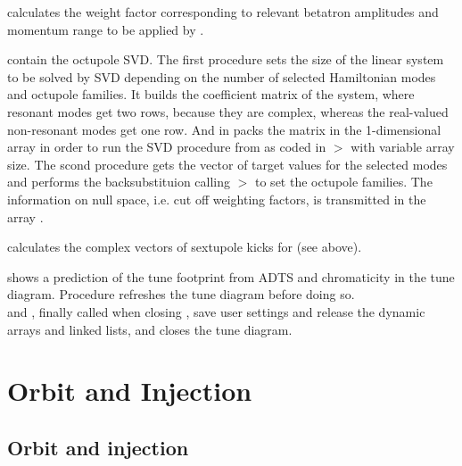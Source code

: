 \documentclass[12pt]{article}
\newcommand\code[1]{{\tt #1}}
\newcommand{\unico}[1]{{\color{burntorange}\code{#1}}}
\newcommand{\prcod}[2]{\opauni{#1}$>$\unico{#2}}
\newcommand{\opagui}[1]{\colorbox{blue!20}{{\color{black}\code{#1}}}}
\newcommand{\oguih}[2]{\subsection{\label{#2}#1}{\Huge\opagui{#2}}\\}
\newcommand{\ogui}[1]{\hyperref[#1]{\opagui{#1}}}
\newcommand{\opauni}[1]{\colorbox{orange!30}{{\color{black}\code{#1}}}}
\newcommand{\ouni}[1]{\hyperref[#1]{\opauni{#1}}}
\begin{document}
{\unico{HamScaling} calculates the weight factor corresponding to relevant betatron amplitudes and momentum range to be applied by \unico{Penalty}.

\unico{Oct\_sv(dcmp,bskb)} contain the octupole SVD. The first procedure sets the size of the linear system to be solved by SVD depending on the number of selected Hamiltonian modes and octupole families. It builds the coefficient matrix of the system, where resonant modes get two rows, because they are complex, whereas the real-valued non-resonant modes get one row. And in packs the matrix in the 1-dimensional array \unico{osvd\_aupack} in order to run the SVD procedure from \cite{numrec} as coded in \prcod{mathlib}{SVDCMP} with variable array size. The scond procedure gets the vector of target values for the selected modes and performs the backsubstituion calling \prcod{mathlib}{SVBKSB} to set the octupole families. The information on null space, i.e. cut off weighting factors, is transmitted in the array \unico{osvd\_wuse}.

\unico{getSVector} calculates the complex vectors of sextupole kicks for \ogui{ochromsvector} (see above).

\unico{TDiagPlot} shows a prediction of the tune footprint from ADTS and chromaticity in the tune diagram. Procedure \unico{TDiagPlotFull} refreshes the tune diagram before doing so.\\[1ex]


\unico{ChromSaveDef} and \unico{ChromDispose}, finally called when closing \ouni{opachroma}, save user settings and release the dynamic arrays and linked lists, and \unico{CloseTuneDiagram} closes the tune diagram.
}


 









\section{\label{secorin}Orbit and Injection}

\oguih{Orbit and injection}{opaorbit} 
\end{document}
